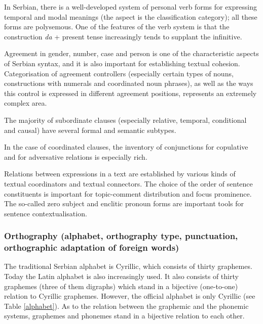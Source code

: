 \begin{multicols}{2}
In Serbian, there is a well-developed system of personal verb forms for expressing temporal and modal meanings (the aspect is the classification category); all these forms are polysemous. One of the features of the verb system is that the construction \textit{da} + present tense increasingly tends to supplant the infinitive.

Agreement in gender, number, case and person is one of the characteristic aspects of Serbian syntax, and it is also important for establishing textual cohesion. Categorisation of agreement controllers (especially certain types of nouns, constructions with numerals and coordinated noun phrases), as well as the ways this control is expressed in different agreement positions, represents an extremely complex area. 

The majority of subordinate clauses (especially relative, temporal, conditional and causal) have several formal and semantic subtypes.

In the case of coordinated clauses, the inventory of conjunctions for copulative and for adversative relations is especially rich.

Relations between expressions in a text are established by various kinds of textual coordinators and textual connectors. The choice of the order of sentence constituents is important for topic-comment distribution and focus prominence. The so-called zero subject and enclitic pronoun forms are important tools for sentence contextualisation. 

\subsubsection {Orthography (alphabet, orthography type, punctuation, orthographic adaptation of foreign words)}
  
The traditional Serbian alphabet is Cyrillic, which consists of thirty graphemes. Today the Latin alphabet is also increasingly used. It also consists of thirty graphemes (three of them digraphs) which stand in a bijective (one-to-one) relation to Cyrillic graphemes. However, the official alphabet is only Cyrillic (see Table \ref{alphabet}).
As to the relation between the graphemic and the phonemic systems, graphemes and phonemes stand in a bijective relation to each other. 


\end{multicols}
